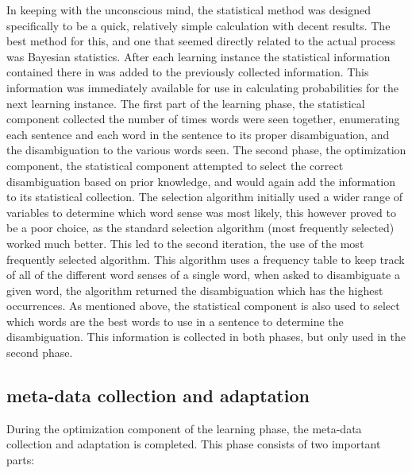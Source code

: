 In keeping with the unconscious mind, the statistical method was designed
specifically to be a quick, relatively simple calculation with decent results.
The best method for this, and one that seemed directly related to the actual
process was Bayesian statistics.  After each learning instance the statistical
information contained there in was added to the previously collected
information.  This information was immediately available for use in calculating
probabilities for the next learning instance.  The first part of the learning
phase, the statistical component collected the number of times words were seen
together, enumerating each sentence and each word in the sentence to its proper
disambiguation, and the disambiguation to the various words seen.  The second
phase, the optimization component, the statistical component attempted to select
the correct disambiguation based on prior knowledge, and would again add the
information to its statistical collection.  The selection algorithm initially
used a wider range of variables to determine which word sense was most likely,
this however proved to be a poor choice, as the standard selection algorithm
(most frequently selected) worked much better.  This led to the second
iteration, the use of the most frequently selected algorithm.  This algorithm
uses a frequency table to keep track of all of the different word senses of a
single word, when asked to disambiguate a given word, the algorithm returned the
disambiguation which has the highest occurrences.  As mentioned above, the
statistical component is also used to select which words are the best words to
use in a sentence to determine the disambiguation. This information is collected
in both phases, but only used in the second phase.

\subsection{meta-data collection and adaptation}

During the optimization component of the learning phase, the meta-data
collection and adaptation is completed.  This phase consists of two important
parts: 

